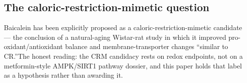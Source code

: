 \documentclass[11pt]{article}
\newcommand{\src}[1]{\allowbreak[#1]}
\begin{document}
\subsection{The caloric-restriction-mimetic question}

Baicalein has been explicitly proposed as a caloric-restriction-mimetic candidate --- the conclusion of a natural-aging Wistar-rat study in which it improved pro-oxidant/antioxidant balance and membrane-transporter changes ``similar to CR.''\src{169} The honest reading: the CRM candidacy rests on redox endpoints, not on a metformin-style AMPK/SIRT1 pathway dossier, and this paper holds that label as a hypothesis rather than awarding it.\src{169}


\end{document}
